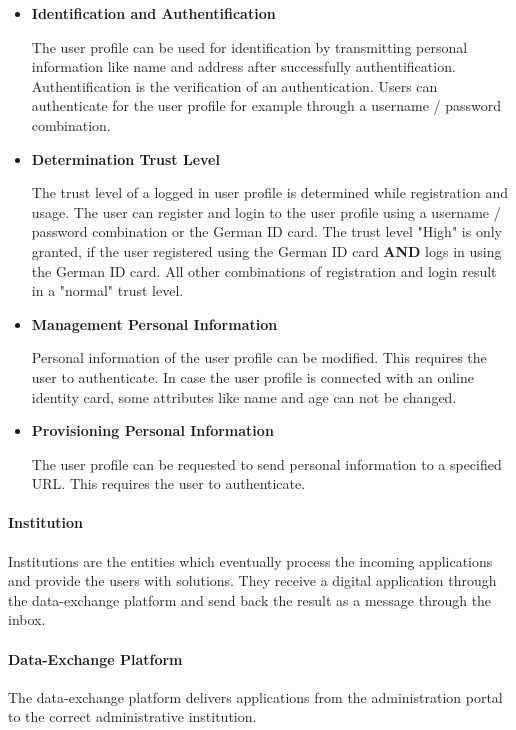 \documentclass[
     12pt,         %
     a4paper,      %
     BCOR=10mm,version=first,     %
     DIV=14,version=first,        %
     ]{scrreprt}
\begin{document}
\begin{itemize}
    \item \textbf{Identification and Authentification} \cite{dNRW:Anbindungsleitfaden}
    
    The user profile can be used for identification by transmitting personal information like name and address after successfully authentification. Authentification is the verification of an authentication. Users can authenticate for the user profile for example through a username / password combination.
    
    \item \textbf{Determination Trust Level} \cite{dNRW:Anbindungsleitfaden}
    
    The trust level of a logged in user profile is determined while registration and usage. The user can register and login to the user profile using a username / password combination or the German ID card. The trust level "High" is only granted, if the user registered using the German ID card \textbf{AND} logs in using the German ID card. All other combinations of registration and login result in a "normal" trust level.
    
    \item \textbf{Management Personal Information} \cite{dNRW:Anbindungsleitfaden} 
    
    Personal information of the user profile can be modified. This requires the user to authenticate. In case the user profile is connected with an online identity card, some attributes like name and age can not be changed.
    
    \item \textbf{Provisioning Personal Information} \cite{dNRW:Anbindungsleitfaden} \cite{dNRW:Schnittstellen}

    The user profile can be requested to send personal information to a specified URL. This requires the user to authenticate.
    
\end{itemize}

\paragraph{Institution}
Institutions are the entities which eventually process the incoming applications and provide the users with solutions. They receive a digital application through the data-exchange platform and send back the result as a message through the inbox.

\paragraph{Data-Exchange Platform}
The data-exchange platform delivers applications from the administration portal to the correct administrative institution.
\end{document}
